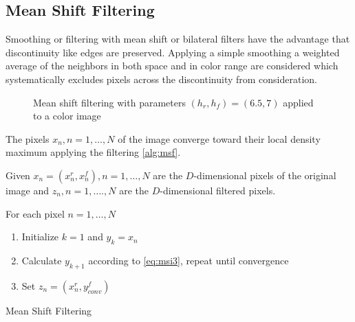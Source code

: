 \subsection{Mean Shift Filtering} %
\label{sub:mean_shift_filtering}
Smoothing or filtering with mean shift or bilateral filters have the advantage
that discontinuity like edges are preserved. Applying a simple smoothing a 
weighted average of the neighbors in both space and in color range are considered
which systematically excludes pixels across the discontinuity from consideration.

\begin{figure}[ht]
\centering
{}%
%
\caption{Mean shift filtering with parameters $(h_r, h_f) = (6.5, 7)$ applied to a color image}
\label{fig:filtsample}
\end{figure}

The pixels $x_n, n = 1, \ldots, N$ of the image converge toward their local density
maximum applying the filtering  \autoref{alg:msf}. 

\begin{algorithm2e}[H]
Given $x_n = (x_n^r, x_n^f), n = 1, \ldots , N$ are the $D$-dimensional pixels
of the original image and $z_n, n = 1 , \ldots. , N$ are the $D$-dimensional
filtered pixels.

For each pixel $n = 1, \ldots , N$
\begin{enumerate}%
 \item Initialize $k = 1$ and $y_k = x_n$
 \item Calculate $y_{k+1}$ according to \autoref{eq:msi3}, repeat
until convergence
 \item Set $z_n = (x_n^r, y_{conv}^f)$
\end{enumerate}

\caption{Mean Shift Filtering}
\label{alg:msf}
\end{algorithm2e}


